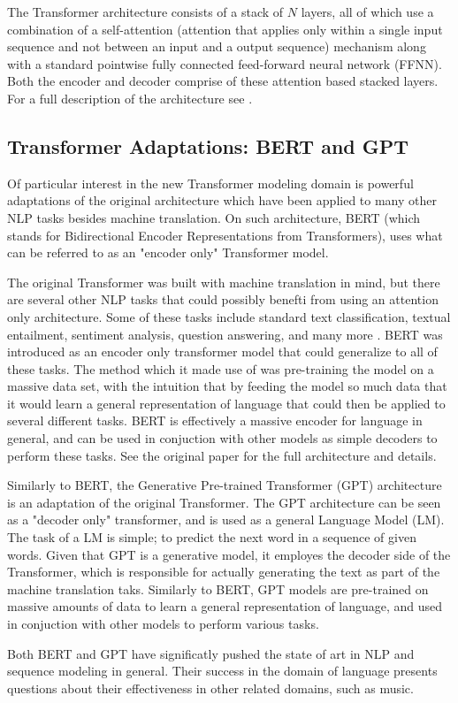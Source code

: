 The Transformer architecture consists of a stack of $N$ layers, all of which use a combination of a self-attention (attention that applies only within a single input sequence and not between an input and a output sequence)  mechanism along with a standard pointwise fully connected feed-forward neural network (FFNN). Both the encoder and decoder comprise of these attention based stacked layers. For a full description of the architecture see \cite{vaswani2017attention}. 

\subsection{Transformer Adaptations: BERT and GPT}
Of particular interest in the new Transformer modeling domain is powerful adaptations of the original architecture which have been applied to many other NLP tasks besides machine translation. On such architecture, BERT (which stands for Bidirectional Encoder Representations from Transformers), uses what can be referred to as an "encoder only" Transformer model. 

The original Transformer was built with machine translation in mind, but there are several other NLP tasks that could possibly benefti from using an attention only architecture. Some of these tasks include standard text classification, textual entailment, sentiment analysis, question answering, and many more . BERT was introduced as an encoder only transformer model that could generalize to all of these tasks. The method which it made use of was pre-training the model on a massive data set, with the intuition that by feeding the model so much data that it would learn a general representation of language that could then be applied to several different tasks. BERT is effectively a massive encoder for language in general, and can be used in conjuction with other models as simple decoders to perform these tasks. See the original paper\cite{devlin2018bert} for the full architecture and details. 

Similarly to BERT, the Generative Pre-trained Transformer (GPT) architecture\cite{radford2019language} is an adaptation of the original Transformer. The GPT architecture can be seen as a "decoder only" transformer, and is used as a general Language Model (LM). The task of a LM is simple; to predict the next word in a sequence of given words. Given that GPT is a generative model, it employes the decoder side of the Transformer, which is responsible for actually generating the text as part of the machine translation taks. Similarly to BERT, GPT models are pre-trained on massive amounts of data to learn a general representation of language, and used in conjuction with other models to perform various tasks. 

Both BERT and GPT have significatly pushed the state of art in NLP and sequence modeling in general. Their success in the domain of language presents questions about their effectiveness in other related domains, such as music. 